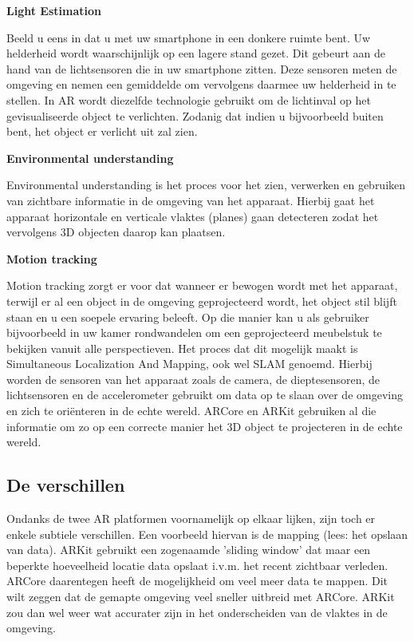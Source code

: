 \textbf{Light Estimation}

Beeld u eens in dat u met uw smartphone in een donkere ruimte bent. Uw helderheid wordt waarschijnlijk op een lagere stand gezet. Dit gebeurt aan de hand van de lichtsensoren die in uw smartphone zitten. Deze sensoren meten de omgeving en nemen een gemiddelde om vervolgens daarmee uw helderheid in te stellen. In AR wordt diezelfde technologie gebruikt om de lichtinval op het gevisualiseerde object te verlichten. Zodanig dat indien u bijvoorbeeld buiten bent, het object er verlicht uit zal zien.

\textbf{Environmental understanding}

Environmental understanding is het proces voor het zien, verwerken en gebruiken van zichtbare informatie in de omgeving van het apparaat. Hierbij gaat het apparaat horizontale en verticale vlaktes (planes) gaan detecteren zodat het vervolgens 3D objecten daarop kan plaatsen.

\textbf{Motion tracking}

Motion tracking zorgt er voor dat wanneer er bewogen wordt met het apparaat, terwijl er al een object in de omgeving geprojecteerd wordt, het object stil blijft staan en u een soepele ervaring beleeft. Op die manier kan u als gebruiker bijvoorbeeld in uw kamer rondwandelen om een geprojecteerd meubelstuk te bekijken vanuit alle perspectieven. Het proces dat dit mogelijk maakt is Simultaneous Localization And Mapping, ook wel SLAM genoemd. Hierbij worden de sensoren van het apparaat zoals de camera, de dieptesensoren, de lichtsensoren en de accelerometer gebruikt om data op te slaan over de omgeving en zich te oriënteren in de echte wereld. ARCore en ARKit gebruiken al die informatie om zo op een correcte manier het 3D object te projecteren in de echte wereld. 

\subsection{De verschillen}

Ondanks de twee AR platformen voornamelijk op elkaar lijken, zijn toch er enkele subtiele verschillen. Een voorbeeld hiervan is de mapping (lees: het opslaan van data). ARKit gebruikt een zogenaamde 'sliding window' dat maar een beperkte hoeveelheid locatie data opslaat i.v.m. het recent zichtbaar verleden. ARCore daarentegen heeft de mogelijkheid om veel meer data te mappen. Dit wilt zeggen dat de gemapte omgeving veel sneller uitbreid met ARCore. ARKit zou dan wel weer wat accurater zijn in het onderscheiden van de vlaktes in de omgeving. 

